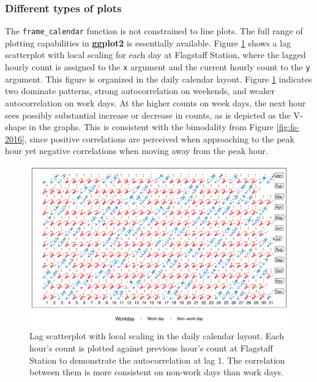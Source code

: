 \documentclass[12pt]{article}
\begin{document}
\hypertarget{different-types-of-plots}{%
\subsubsection{Different types of plots}\label{different-types-of-plots}}

The \texttt{frame\_calendar} function is not constrained to line plots. The full range of plotting capabilities in \textbf{ggplot2} is essentially available. Figure \ref{fig:scatterplot} shows a lag scatterplot with local scaling for each day at Flagstaff Station, where the lagged hourly count is assigned to the \texttt{x} argument and the current hourly count to the \texttt{y} argument. This figure is organized in the daily calendar layout. Figure \ref{fig:scatterplot} indicates two dominate patterns, strong autocorrelation on weekends, and weaker autocorrelation on work days. At the higher counts on week days, the next hour sees possibly substantial increase or decrease in counts, as is depicted as the V-shape in the graphs. This is consistent with the bimodality from Figure \ref{fig:fs-2016}, since positive correlations are perceived when approaching to the peak hour yet negative correlations when moving away from the peak hour.

\begin{figure}

{\centering \includegraphics[width=\textwidth]{figure/scatterplot-1} 

}

\caption{Lag scatterplot with local scaling in the daily calendar layout. Each hour's count is plotted against previous hour's count at Flagstaff Station to demonstrate the autocorrelation at lag 1. The correlation between them is more consistent on non-work days than work days.}\label{fig:scatterplot}
\end{figure}
\end{document}
